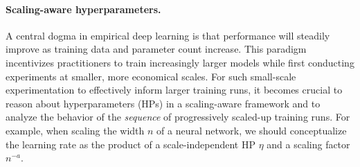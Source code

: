 \documentclass{article} %
\begin{document}
\paragraph{Scaling-aware hyperparameters.}
A central dogma in empirical deep learning is that performance will steadily improve \cite{kaplan2020scaling, hoffmann2022training} as training data and parameter count increase. This paradigm incentivizes practitioners to train increasingly larger models while first conducting experiments at smaller, more economical scales. For such small-scale experimentation to effectively inform larger training runs, it becomes crucial to reason about hyperparameters (HPs) in a scaling-aware framework and to analyze the behavior of the \textit{sequence} of progressively scaled-up training runs. 
For example, when scaling the width $n$ of a neural network, we should conceptualize the learning rate as the product of a scale-independent HP $\eta$ and a scaling factor $n^{-a}$. 
\end{document}
